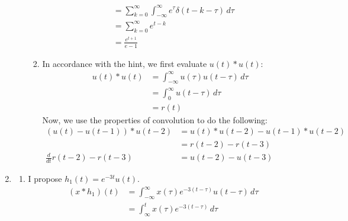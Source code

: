 \documentclass[12pt]{article}
\begin{document}
\begin{enumerate}
\begin{enumerate}
\begin{enumerate}
\begin{align*}
                                           & = \sum_{k=0}^{\infty} \int_{-\infty}^{\infty} e^\tau \delta(t-k-\tau)\,d\tau \\
                                           & = \sum_{k=0}^{\infty} e^{t-k}                                                \\
                                           & = \boxed{\frac{e^{t+1}}{e-1}}
                                    \end{align*}
                              \item In accordance with the hint, we first evaluate $u(t)*u(t)$:
                                    \begin{align*}
                                          u(t) * u(t)
                                           & = \int_{-\infty}^{\infty} u(\tau)u(t-\tau)\,d\tau \\
                                           & = \int_{0}^{\infty} u(t-\tau)\,d\tau              \\
                                           & = r(t)
                                    \end{align*}
                                    Now, we use the properties of convolution to do the following:
                                    \begin{align*}
                                          (u(t)-u(t-1))*u(t-2)       & = u(t)*u(t-2)-u(t-1)*u(t-2) \\
                                                                     & = r(t-2)-r(t-3)             \\
                                          \frac{d}{dt} r(t-2)-r(t-3) & = \boxed{u(t-2)-u(t-3)}
                                    \end{align*}
                        \end{enumerate}
            \end{enumerate}
      \item \begin{enumerate}
                  \item I propose $h_1(t)=e^{-3t}u(t)$.
                        \begin{align*}
                              (x*h_1)(t)
                               & = \int_{-\infty}^{\infty} x(\tau)e^{-3(t-\tau)}u(t-\tau)\,d\tau \\
                               & = \int_{\infty}^{t} x(\tau) e^{-3(t-\tau)}\,d\tau
                        \end{align*}

\end{enumerate}
\end{enumerate}
\end{document}
